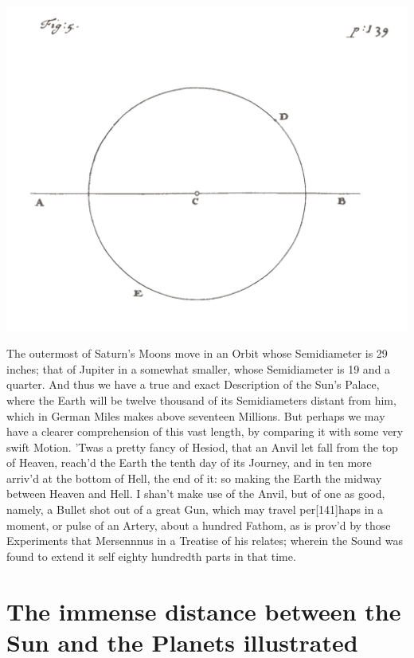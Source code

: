 \documentclass[letterpaper]{book}
\begin{document}
\begin{center}
	\includegraphics[width=.90\textwidth]{ct_5_en.jpg}
\end{center}

The outermost of Saturn's Moons move in an Orbit whose Semidiameter is
29 inches; that of Jupiter in a somewhat smaller, whose Semidiameter is 19 and
a quarter.  And thus we have a true and exact Description of the Sun's Palace,
where the Earth will be twelve thousand of its Semidiameters distant from him,
which in German Miles makes above seventeen Millions. But perhaps we may have a
clearer comprehension of this vast length, by comparing it with some very swift
Motion. 'Twas a pretty fancy of Hesiod, that an Anvil let fall from the top of
Heaven, reach'd the Earth the tenth day of its Journey, and in ten more arriv'd
at the bottom of Hell, the end of it: so making the Earth the midway between
Heaven and Hell. I shan't make use of the Anvil, but of one as good, namely, a
Bullet shot out of a great Gun, which may travel per[141]haps in a moment, or
pulse of an Artery, about a hundred Fathom, as is prov'd by those Experiments
that Mersennnus in a Treatise of his relates; wherein the Sound was found to
extend it self eighty hundredth parts in that time.


\section{The immense distance between the Sun and the Planets illustrated}
\end{document}
